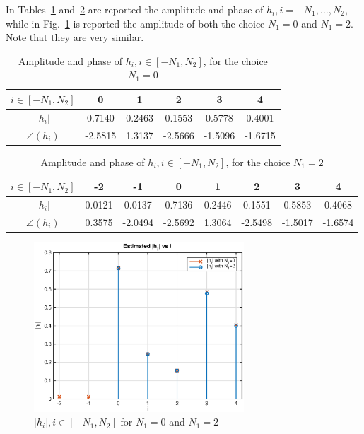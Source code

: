\documentclass[10pt]{article}
\begin{document}
In Tables~\ref{table:h0} and~\ref{table:h2} are reported the amplitude and phase of $h_i, i = -N_1, \dots, N_2$, while in Fig.~\ref{fig:hi_p1} is reported the amplitude of both the choice $N_1 = 0$ and $N_1 = 2$. Note that they are very similar.


\begin{table}[h!]
	\centering
	\begin{tabular}{c|c|c|c|c|c}
		$i \in [-N_1, N_2]$ & 0 & 1 & 2 & 3 & 4 \\ \hline
		$|h_i|$ 		& 0.7140  &  0.2463  &  0.1553  &  0.5778  &  0.4001 \\
		$\angle(h_i)$ 	& -2.5815  &  1.3137  & -2.5666  & -1.5096  & -1.6715 \\
	\end{tabular}
	\caption{Amplitude and phase of $h_i, i \in [-N_1, N_2]$, for the choice $N_1 = 0$}
	\label{table:h0}
\end{table}

\begin{table}[h!]
	\centering
	\begin{tabular}{c|c|c|c|c|c|c|c}
		$i \in [-N_1, N_2]$ & -2 & -1 & 0 & 1 & 2 & 3 & 4 \\ \hline
		$|h_i|$ 	&	0.0121  &  0.0137  &  0.7136   & 0.2446  &  0.1551  &  0.5853  &  0.4068 \\
		$\angle(h_i)$ &	0.3575  & -2.0494  & -2.5692   & 1.3064  & -2.5498  & -1.5017  & -1.6574 \\
	\end{tabular}
	\caption{Amplitude and phase of $h_i, i \in [-N_1, N_2]$, for the choice $N_1 = 2$}
	\label{table:h2}
\end{table}

\begin{figure}[h!]
 \centering
 \includegraphics[width = 0.7\textwidth]{hi_p1}
 \caption{$|h_i|, i \in [-N_1, N_2]$ for $N_1 = 0$ and $N_1 = 2$}
 \label{fig:hi_p1}
\end{figure}
\end{document}
